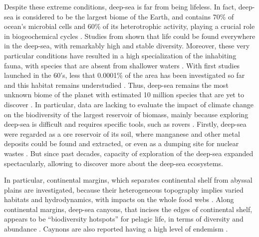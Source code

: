 Despite these extreme conditions, deep-sea is far from being lifeless. In fact, deep-sea is considered to be the largest biome of the Earth, and contains 70\% of ocean's microbial cells and 60\% of its heterotrophic activity, playing a crucial role in biogeochemical cycles \citep{salazar2016}. Studies from \citet{grassle1992,parkes1994,todo2005} shown that life could be found everywhere in the deep-sea, with remarkably high and stable diversity. Moreover, these very particular conditions have resulted in a high specialization of the inhabiting fauna, with species that are absent from shallower waters \citep{garcia2021}. With first studies launched in the 60's, less that 0.0001\% of the area has been investigated so far and this habitat remains understudied \citep{danovaro2017,richards2019}. Thus, deep-sea remains the most unknown biome of the planet with estimated 10 million species that are yet to discover \citep{danovaro2017,grassle1992}. In particular, data are lacking to evaluate the impact of climate change on the biodiversity of the largest reservoir of biomass, mainly because exploring deep-sea is difficult and requires specific tools, such as rovers \citep{danovaro2008,danovaro2014}. Firstly, deep-sea were regarded as a ore reservoir of its soil, where manganese and other metal deposits could be found and extracted, or even as a dumping site for nuclear wastes \citep{baker2020,gillet2013,halfar2002}. But since past decades, capacity of exploration of the deep-sea expanded spectacularly, allowing to discover more about the deep-sea ecosystems\citep{danovaro2014}.

In particular, continental margins, which separates continental shelf from abyssal plains are investigated, because their heterogeneous topography implies varied habitats and hydrodynamics, with impacts on the whole food webs \citep{danovaro2009,fernandez-arcaya2017}. Along continental margins, deep-sea canyons, that incises the edges of continental shelf, appears to be ``biodiversity hotspots'' for pelagic life, in terms of diversity and abundance \citep{aissi2012,danovaro2009,gillet2013,robertson2020}. Caynons are also reported having a high level of endemism \citep{danovaro2009,danovaro2017}. 


